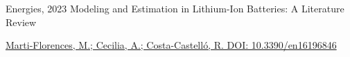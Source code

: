 \cventry
  {Energies, 2023}
  {Modeling and Estimation in Lithium-Ion Batteries: A Literature Review}
  {}
  {}
  {
    \begin{cvitems}
      \item {\href{https://doi.org/10.3390/en16196846}{Marti-Florences, M.; Cecilia, A.; Costa-Castell\'o, R. DOI: 10.3390/en16196846}}
    \end{cvitems}
  }
